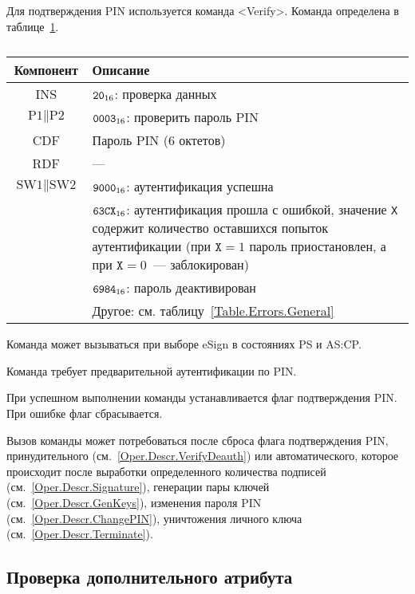 Для подтверждения PIN используется команда <Verify>. 
Команда определена в таблице~\ref{Table.Oper.VerifyPINCmd}.

\begin{table}[hbt]
\caption{}\label{Table.Oper.VerifyPINCmd}
\begin{tabular}{|c|p{14cm}|}
\hline
Компонент & Описание \\
\hline
\hline
INS & $\texttt{20}_{16}$: проверка данных\\
\hline
$\text{P1} \parallel \text{P2}$ & $\texttt{0003}_{16}$: 
проверить пароль PIN\\
\hline
CDF & Пароль PIN (6 октетов)\\
\hline 
\hline
RDF &  --- \\
\hline
$\text{SW1} \parallel \text{SW2}$ & $\texttt{9000}_{16}$: аутентификация успешна\\
\cline{2-2}
 & $\texttt{63CX}_{16}$: аутентификация прошла с ошибкой, 
значение \texttt{X} содержит количество оставшихся попыток аутентификации (при 
$\texttt{X} = 1$ пароль приостановлен, а при $\texttt{X} = 0$~--- 
заблокирован)\\ 
\cline{2-2}
& $\texttt{6984}_{16}$: пароль деактивирован \\
\cline{2-2}
 & Другое: см. таблицу~\ref{Table.Errors.General} \\
\hline
\end{tabular}
\end{table}

Команда может вызываться при выборе eSign в состояниях PS и AS:CP.

Команда требует предварительной аутентификации по PIN.

При успешном выполнении команды устанавливается флаг подтверждения PIN. При 
ошибке флаг сбрасывается. 

Вызов команды может потребоваться после сброса флага подтверждения PIN, 
принудительного (см.~\ref{Oper.Descr.VerifyDeauth}) или автоматического,
которое происходит после выработки определенного количества подписей 
(см.~\ref{Oper.Descr.Signature}), генерации пары ключей 
(см.~\ref{Oper.Descr.GenKeys}), изменения пароля PIN 
(см.~\ref{Oper.Descr.ChangePIN}), уничтожения личного ключа 
(см.~\ref{Oper.Descr.Terminate}). 

\subsection{Проверка дополнительного атрибута}
\label{Oper.Descr.VerifyData}

